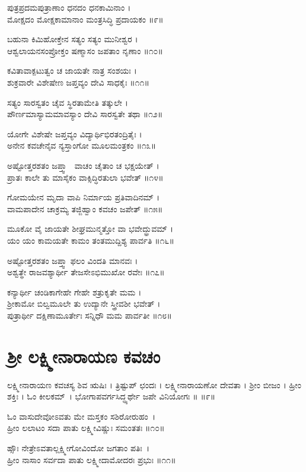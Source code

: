 ಪುತ್ರಪ್ರದಮಪುತ್ರಾಣಾಂ ಧನದಂ ಧನಕಾಮಿನಾಂ ।\\
ಮೋಕ್ಷದಂ ಮೋಕ್ಷಕಾಮಾನಾಂ ಮಂತ್ರಸಿದ್ಧಿ ಪ್ರದಾಯಕಂ ॥೯॥

ಬಹುನಾ ಕಿಮಿಹೋಕ್ತೇನ ಸತ್ಯಂ ಸತ್ಯಂ ಮುನೀಶ್ವರ ।\\
ಆಶ್ವಲಾಯನಸಂಪ್ರೋಕ್ತಂ ಷಣ್ಮಾಸಂ ಜಪತಾಂ ನೃಣಾಂ ॥೧೦॥

ಕವಿತಾವಾಕ್ಪಟುತ್ವಂ ಚ ಜಾಯತೇ ನಾತ್ರ ಸಂಶಯಃ ।\\
ಶುಕ್ರವಾರೇ ವಿಶೇಷೇಣ ಜಪ್ತವ್ಯಂ ದೇವಿ ಸಾಧಕೈಃ ॥೧೧॥

ಸತ್ಯಂ ಸಾರಸ್ವತಂ ಚೈವ ಸ್ಥಿರತಾಮೇತಿ ತತ್ಕುಲೇ ।\\
ಪೌರ್ಣಮಾಸ್ಯಾಮಮಾವಸ್ಯಾಂ ದೇವಿ ಸಾರಸ್ವತೇ ತಥಾ ॥೧೨॥

ಯೋಗೇ ವಿಶೇಷೇ ಜಪ್ತವ್ಯಂ ವಿದ್ಯಾರ್ಥಿಭಿರತಂದ್ರಿತೈಃ ।\\
ಅನೇನ ಕವಚೇನೈವ ನ್ಯಸ್ತಾಂಗೋ ಮೂಲಮಂತ್ರಕಂ ॥೧೩॥

ಅಷ್ಟೋತ್ತರಶತಂ ಜಪ್ತ್ವಾ  ವಾಚಂ ಚೈತಾಂ ಚ ಭಕ್ಷಯೇತ್ ।\\
ಪ್ರಾತಃ ಕಾಲೇ ತು ಮಾಸೈಕಂ ವಾಕ್ಸಿದ್ಧಿರತುಲಾ ಭವೇತ್ ॥೧೪॥

ಗೋಮಯೇನ ಮೃದಾ ವಾಪಿ ನಿರ್ಮಾಯ ಪ್ರತಿವಾದಿನಮ್ ।\\
ವಾಮಪಾದೇನ ಚಾಕ್ರಮ್ಯ ತಜ್ಜಿಹ್ವಾಂ ಕವಚಂ ಜಪೇತ್ ॥೧೫॥

ಮೂಕೋ ವೈ ಜಾಯತೇ ಶೀಘ್ರಮುನ್ಮತ್ತೋ ವಾ ಭವೇದ್ಧ್ರುವಮ್ ।\\
ಯಂ ಯಂ ಕಾಮಯತೇ ಕಾಮಂ ತಂತಮುದ್ದಿಶ್ಯ ಪಾರ್ವತಿ ॥೧೬॥

ಅಷ್ಟೋತ್ತರಶತಂ ಜಪ್ತ್ವಾ ಫಲಂ ವಿಂದತಿ ಮಾನವಃ ।\\
ಅಶ್ವತ್ಥೇ ರಾಜವಶ್ಯಾರ್ಥೀ ತೇಜಸೇಽಭಿಮುಖೋ ರವೇಃ ॥೧೭॥

ಕನ್ಯಾರ್ಥೀ ಚಂಡಿಕಾಗೇಹೇ ಗೇಹೇ ಶತ್ರುಕೃತೇ ಮಮ ।\\
ಶ್ರೀಕಾಮೋ ಬಿಲ್ವಮೂಲೇ ತು ಉದ್ಯಾನೇ ಸ್ತ್ರೀವಶೀ ಭವೇತ್ ।\\
ಪುತ್ರಾರ್ಥೀ ದಕ್ಷಿಣಾಮೂರ್ತೇಃ ಸನ್ನಿಧೌ ಮಮ ಪಾರ್ವತೀ ॥೧೮॥
\section{ಶ್ರೀ ಲಕ್ಷ್ಮೀನಾರಾಯಣ ಕವಚಂ }
ಲಕ್ಷ್ಮೀನಾರಾಯಣ  ಕವಚಸ್ಯ ಶಿವ ಋಷಿಃ । ತ್ರಿಷ್ಟುಪ್ ಛಂದಃ । ಲಕ್ಷ್ಮೀನಾರಾಯಣೋ ದೇವತಾ ।  ಶ್ರೀಂ ಬೀಜಂ । ಹ್ರೀಂ ಶಕ್ತಿಃ । ಓಂ ಕೀಲಕಮ್~। ಭೋಗಾಪವರ್ಗಸಿದ್ಧ್ಯರ್ಥೇ ಜಪೇ ವಿನಿಯೋಗಃ ॥
\newpage
{}॥೯॥

ಓಂ ವಾಸುದೇವೋಽವತು ಮೇ ಮಸ್ತಕಂ ಸಶಿರೋರುಹಂ~।\\
ಹ್ರೀಂ ಲಲಾಟಂ ಸದಾ ಪಾತು ಲಕ್ಷ್ಮೀವಿಷ್ಣುಃ ಸಮಂತತಃ ॥೧೦॥

ಹ್ಸೌಃ ನೇತ್ರೇಽವತಾಲ್ಲಕ್ಷ್ಮೀಗೋವಿಂದೋ ಜಗತಾಂ ಪತಿಃ~।\\
ಹ್ರೀಂ ನಾಸಾಂ ಸರ್ವದಾ ಪಾತು ಲಕ್ಷ್ಮೀದಾಮೋದರಃ ಪ್ರಭುಃ ॥೧೧॥

